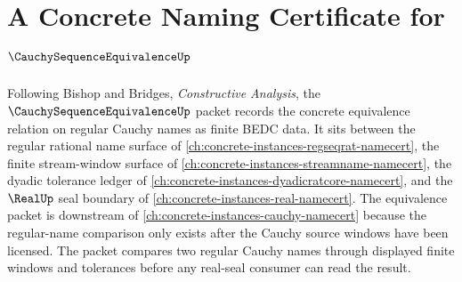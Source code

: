 \chapter{A Concrete Naming Certificate for $\CauchySequenceEquivalenceUp$}
\label{ch:concrete-instances-cauchysequenceequivalence-namecert}

Following Bishop and Bridges, \emph{Constructive Analysis}, the $\CauchySequenceEquivalenceUp$ packet records the concrete equivalence relation on regular Cauchy names as finite BEDC data. It sits between the regular rational name surface of \autoref{ch:concrete-instances-regseqrat-namecert}, the finite stream-window surface of \autoref{ch:concrete-instances-streamname-namecert}, the dyadic tolerance ledger of \autoref{ch:concrete-instances-dyadicratcore-namecert}, and the $\RealUp$ seal boundary of \autoref{ch:concrete-instances-real-namecert}. The equivalence packet is downstream of \autoref{ch:concrete-instances-cauchy-namecert} because the regular-name comparison only exists after the Cauchy source windows have been licensed. The packet compares two regular Cauchy names through displayed finite windows and tolerances before any real-seal consumer can read the result.

